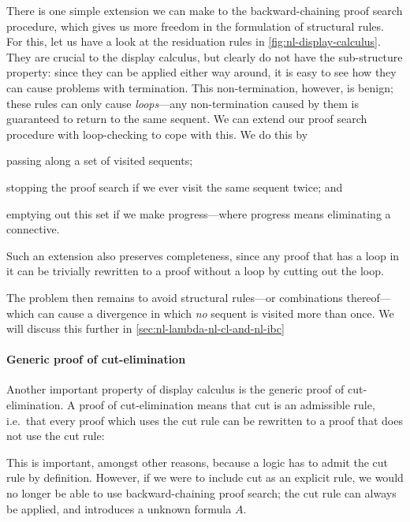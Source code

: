 There is one simple extension we can make to the backward-chaining
proof search procedure, which gives us more freedom in the formulation
of structural rules. For this, let us have a look at the residuation
rules in \autoref{fig:nl-display-calculus}. They are crucial to the
display calculus, but clearly do not have the sub-structure property:
since they can be applied either way around, it is easy to see how
they can cause problems with termination.
This non-termination, however, is benign; these rules can only cause
\emph{loops}---any non-termination caused by them is guaranteed to
return to the same sequent.
We can extend our proof search procedure with loop-checking to cope
with this. We do this by
\begin{enumerate*}[label=(\arabic*)]
\item passing along a set of visited sequents;
\item stopping the proof search if we ever visit the same sequent
  twice; and
\item emptying out this set if we make progress---where progress means
  eliminating a connective.
\end{enumerate*}
Such an extension also preserves completeness, since any proof that
has a loop in it can be trivially rewritten to a proof without a loop by
cutting out the loop.

The problem then remains to avoid structural rules---or combinations
thereof---which can cause a divergence in which \emph{no} sequent is
visited more than once. We will discuss this further in
\autoref{sec:nl-lambda-nl-cl-and-nl-ibc}

\paragraph{Generic proof of cut-elimination}
Another important property of display calculus is the generic proof of
cut-elimination.
A proof of cut-elimination means that cut is an admissible rule, i.e.\
that every proof which uses the cut rule can be rewritten to a proof
that does not use the cut rule:
\begin{prooftree}
\end{prooftree}
This is important, amongst other reasons, because a logic has to admit
the cut rule by definition. However, if we were to include cut as an
explicit rule, we would no longer be able to use backward-chaining
proof search; the cut rule can always be applied, and introduces a
unknown formula $A$.

